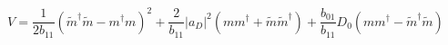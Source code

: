 \begin{equation}
V=\frac{1}{2{b}_{11}}\left( \tilde{m}^{\dagger }\tilde{m}-m^{\dagger
}m\right) ^{2}+\frac{2}{{b}_{11}}\left| a_{D}\right| ^{2}\left( mm^{\dagger
}+\tilde{m}\tilde{m}^{\dagger }\right) +\frac{{b}_{01}}{{b}_{11}}D_{0}\left(
mm^{\dagger }-\tilde{m}^{\dagger }\tilde{m}\right)
\label{treepot}
\end{equation}

